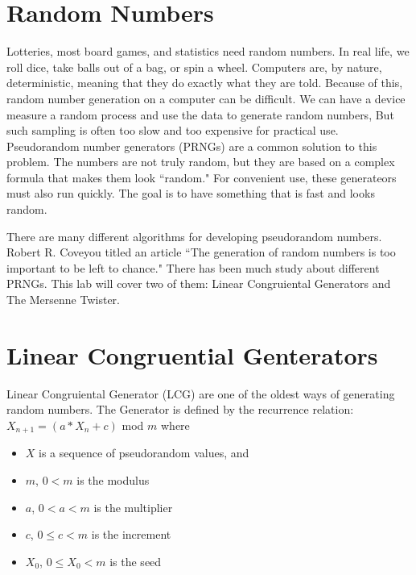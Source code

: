 \label{Ch:PRNG}


\section*{Random Numbers}

Lotteries, most board games, and statistics need random numbers.
In real life, we roll dice, take balls out of a bag, or spin a wheel.
Computers are, by nature, deterministic, meaning that they do exactly what they are told.
Because of this, random number generation on a computer can be difficult.
We can have a device measure a random process and use the data to generate random numbers, 
But such sampling is often too slow and too expensive for practical use.
Pseudorandom number generators (PRNGs) are a common solution to this problem.
The numbers are not truly random, but they are based on a complex formula that makes them look ``random."
For convenient use, these generateors must also run quickly.
The goal is to have something that is fast and looks random.

There are many different algorithms for developing pseudorandom numbers.
Robert R. Coveyou titled an article ``The generation of random numbers is too important to be left to chance."
There has been much study about different PRNGs.
This lab will cover two of them: Linear Congruiental Generators and The Mersenne Twister.

\section*{Linear Congruential Genterators}

Linear Congruiental Generator (LCG) are one of the oldest ways of generating random numbers.
The Generator is defined by the recurrence relation:
$X_{n+1}=(a*X_n + c)$ mod $m$ where

\begin{itemize}
\item $X$ is a sequence of pseudorandom values, and
\item $m$, $0<m$ is the modulus
\item $a$, $0<a<m$ is the multiplier
\item $c$, $0\leq c<m$ is the increment
\item $X_0$, $0\leq X_0 <m$ is the seed
\end{itemize}

